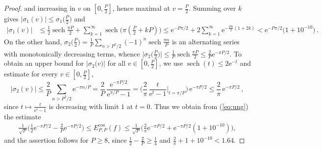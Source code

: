 \documentclass[10pt,a4paper]{amsart}
\newcommand{\Ecos}{E^{\cos}}
\newcommand{\e}{\mathrm e}
\begin{document}
\begin{proof}
 and increasing in $v$ on $[0,\frac P2]$, hence maximal at
$v=\frac P2$. Summing over $k$ gives $|\sigma_1(v)| \le \sigma_1\big(\frac P2\big)$ and
\begin{align*}
 \textstyle \big|\sigma_1(v)\big| &\le   \textstyle
 \tfrac{1}{2}\operatorname{sech}\tfrac{\pi P}{2} +  \sum\limits_{k=1}^\infty \operatorname{sech}\big(\pi(\tfrac P2 + kP)\big)
 \le  \e^{-P\pi/2} + 2 \sum\limits_{k=1}^\infty \e^{-\frac{P\pi}{2}(1+2k)}
 < \e^{-P\pi/2} \big(1 + 10^{-10}\big)\,.
 \end{align*}
On the other hand, $\sigma_2\big(\tfrac P2\big) = \frac1P\sum_{n>P^2/2}(-1)^n\operatorname{sech}\tfrac{\pi n}{P}$
is an alternating series with monotonically decreasing terms, whence
$\big|\sigma_2\big(\tfrac P2\big)\big| \le \tfrac1P\operatorname{sech}\tfrac{\pi P}{2} \le \tfrac2P\e^{-\pi P/2}$.
 To obtain an upper bound for $\big|\sigma_2\big(v\big)\big|$ for all $v \in [0,\frac P2]$, we use
$\operatorname{sech}(t) \le 2\e^{-t}$ and estimate for every $v \in [0,\frac P2]$,
$$
\textstyle |\sigma_2(v)| \le \frac2P \sum\limits_{n>P^2/2}\e^{-\pi n/P}
= \frac{2}{P}\,\frac{\e^{-\pi P/2}}{\e^{\pi/P}-1}
= \Big( \frac{2}{\pi}\,\frac{t}{\e^{t}-1}\Big|_{t = \pi/P} \Big) \, \e^{-\pi P/2}
\le \frac{2}{\pi}\,\e^{-\pi P/2}\,,
$$
since $t \mapsto \frac{t}{\e^t-1}$ is decreasing with limit $1$ at $t=0$.
Thus we obtain from (\ref{eq:ung}) the estimate
\begin{align*}
 \textstyle
\frac{1}{\sqrt{P}} \big( \frac{1}{2} \e^{-\pi P/2}  -  \frac{2}{P} \e^{-\pi P/2} \big) \le   \Ecos_{P,P}(f)
\le   \frac{1}{\sqrt{P}}  \big( \tfrac{2}{\pi} \e^{-\pi P/2} + \e^{-\pi P/2} (1 + 10^{-10}) \big),
\end{align*}
and the assertion follows for $P\ge 8$, since $\frac12 - \frac2P \ge \frac14$ and
$\frac2\pi + 1 + 10^{-10} < 1.64$.
\end{proof}
\end{document}

